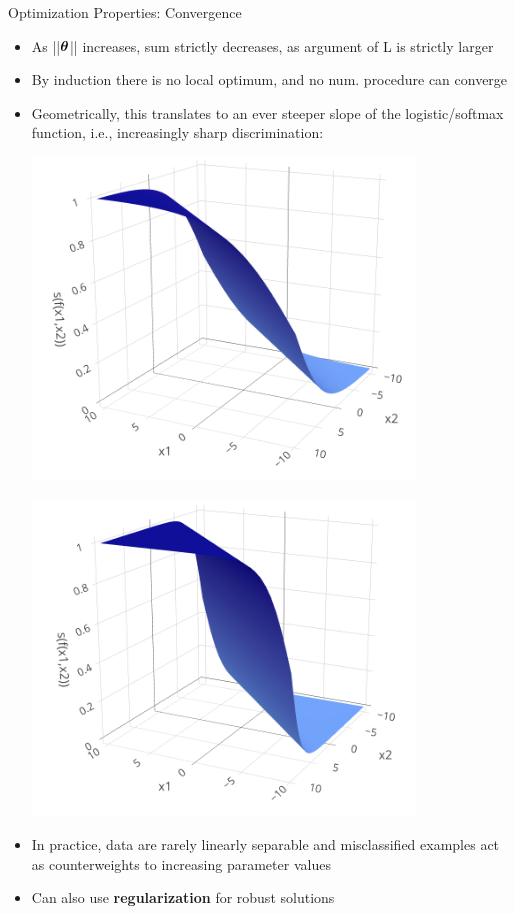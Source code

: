 \documentclass[11pt,compress,t,notes=noshow, xcolor=table]{beamer}
\begin{document}
\begin{vbframe}{Optimization Properties: Convergence}
\begin{itemize}
\item As ||$\bm{\theta}$|| increases, sum strictly decreases, as argument of L is strictly larger


\item By induction there is no local optimum, and no num. procedure can converge
  \end{itemize} 

\framebreak

\begin{itemize}
  \small
  \item
  Geometrically, this translates to an ever steeper slope of the 
  logistic/softmax function, i.e., increasingly sharp discrimination:
  
  \vspace{0.3cm}
  \begin{minipage}[b]{0.5\textwidth}
    \includegraphics[width=0.8\textwidth]{figure/softmax_1}
  \end{minipage}%
  \begin{minipage}[b]{0.5\textwidth}
    \includegraphics[width=0.8\textwidth]{figure/softmax_2}
  \end{minipage}%
  \item In practice, data are rarely linearly separable and misclassified 
  examples act as counterweights to increasing parameter values
  \item Can also use \textbf{regularization} for  robust solutions
\end{itemize}

\end{vbframe}


\endlecture
\end{document}
